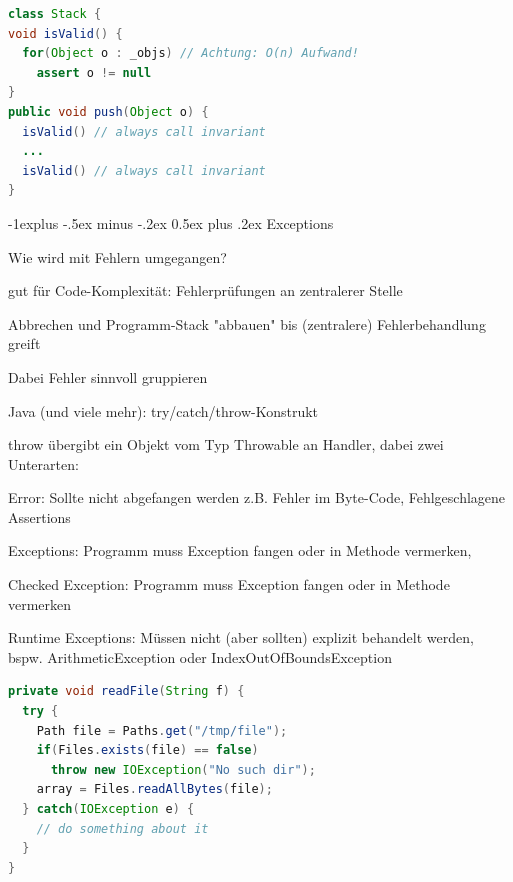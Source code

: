\documentclass[10pt]{article}
\makeatletter
\renewcommand{\subsection}{\@startsection{subsection}{2}{0mm}%
                                {-1explus -.5ex minus -.2ex}%
                                {0.5ex plus .2ex}%
                                {\normalfont\normalsize\bfseries}}
\makeatother
\begin{document}
\begin{lstlisting}[language=java]
class Stack {
void isValid() {
  for(Object o : _objs) // Achtung: O(n) Aufwand!
    assert o != null
}
public void push(Object o) {
  isValid() // always call invariant
  ...
  isValid() // always call invariant
}
\end{lstlisting}

\subsection{Exceptions}
\begin{itemize*}
  \item Wie wird mit Fehlern umgegangen?
  \item gut für Code-Komplexität: Fehlerprüfungen an zentralerer Stelle
  \begin{itemize*}
    \item Abbrechen und Programm-Stack "abbauen" bis (zentralere) Fehlerbehandlung greift
    \item Dabei Fehler sinnvoll gruppieren
  \end{itemize*}
  \item Java (und viele mehr): try/catch/throw-Konstrukt
  \begin{itemize*}
    \item throw übergibt ein Objekt vom Typ Throwable an Handler, dabei zwei Unterarten:
    \item Error: Sollte nicht abgefangen werden z.B. Fehler im Byte-Code, Fehlgeschlagene Assertions
    \item Exceptions: Programm muss Exception fangen oder in Methode vermerken,
    \begin{itemize*}
      \item Checked Exception: Programm muss Exception fangen oder in Methode vermerken
      \item Runtime Exceptions: Müssen nicht (aber sollten) explizit behandelt werden, bspw. ArithmeticException oder IndexOutOfBoundsException
    \end{itemize*}
  \end{itemize*}
\end{itemize*}

\begin{lstlisting}[language=java]
private void readFile(String f) {
  try {
    Path file = Paths.get("/tmp/file");
    if(Files.exists(file) == false)
      throw new IOException("No such dir");
    array = Files.readAllBytes(file);
  } catch(IOException e) {
    // do something about it
  }
}
\end{lstlisting}
\end{document}
